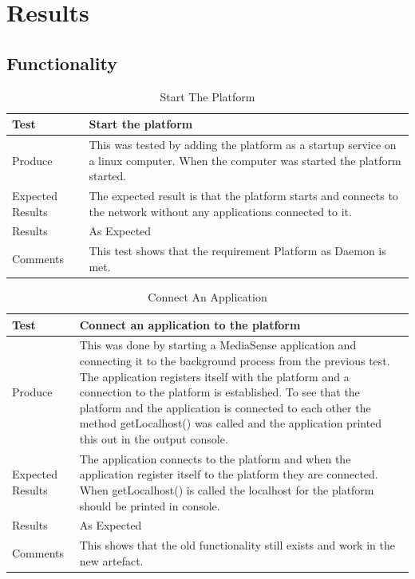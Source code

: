 \section{Results}
\subsection{Functionality}

\begin{table}[!h]
    \begin{tabular}{ | l | p{12cm} |}
    \hline
    Test 	 				& 		 Start the platform\\ \hline
	Produce  				& 		 This was tested by adding the platform as a startup service on a linux computer. When the computer was started the platform started.\\ \hline
	Expected Results  		& 		 The expected result is that the platform starts and connects to the network without any applications connected to it. \\ \hline
	Results 				& 		 As Expected\\ \hline
	Comments				& 		 This test shows that the requirement Platform as Daemon is met.\\ \hline
    \end{tabular}
    \caption{Start The Platform}
\end{table}

\begin{table}[!h]
    \begin{tabular}{ | l | p{12cm} |}
    \hline
    Test 	 				& 		 Connect an application to the platform \\ \hline
	Produce  				& 		 This was done by starting a MediaSense application and connecting it to the background process from the previous test. The application registers itself with the platform and a connection to the platform is established. To see that the platform and the application is connected to each other the method getLocalhost() was called and the application printed this out in the output console. \\ \hline
	Expected Results  		& 		 The application connects to the platform and when the application register itself to the platform they are connected. When getLocalhost() is called the localhost for the platform should be printed in console. \\ \hline
	Results 				& 		 As Expected\\ \hline
	Comments				& 		 This shows that the old functionality still exists and work in the new artefact.\\ \hline
    \end{tabular}
    \caption{Connect An Application}
\end{table}

